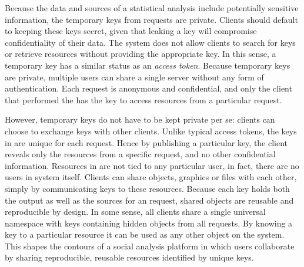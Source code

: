 Because the data and sources of a statistical analysis include potentially sensitive information, the temporary keys from \RPC requests are private. Clients should default to keeping these keys secret, given that leaking a key will compromise confidentiality of their data. The system does not allow clients to search for keys or retrieve resources without providing the appropriate key. In this sense, a temporary key has a similar status as an \emph{access token}. Because temporary keys are private, multiple users can share a single \OpenCPU server without any form of authentication. Each request is anonymous and confidential, and only the client that performed the \RPC has the key to access resources from a particular request.

However, temporary keys do not have to be kept private per se: clients can choose to exchange keys with other clients. Unlike typical access tokens, the keys in \OpenCPU are unique for each request. Hence by publishing a particular key, the client reveals only the resources from a specific \RPC request, and no other confidential information. Resources in \OpenCPU are not tied to any particular user, in fact, there are no users in \OpenCPU system itself. Clients can share objects, graphics or files with each other, simply by communicating keys to these resources. Because each key holds both the output as well as the sources for an \RPC request, shared objects are reusable and reproducible by design. In some sense, all clients share a single universal namespace with keys containing hidden objects from all \RPC requests. By knowing a key to a particular resource it can be used as any other object on the system. This shapes the contours of a social analysis platform in which users collaborate by sharing reproducible, reusable resources identified by unique keys.